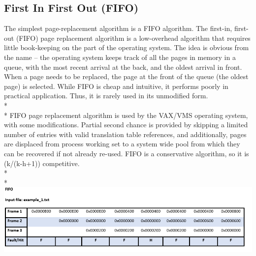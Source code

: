 \documentclass[12pt, oneside, a4paper]{report}
\begin{document}
\subsection*{First In First Out (FIFO)}
The simplest page-replacement algorithm is a FIFO algorithm. The first-in, first-out (FIFO) page replacement algorithm is a low-overhead algorithm that requires little book-keeping on the part of the operating system. The idea is obvious from the name – the operating system keeps track of all the pages in memory in a queue, with the most recent arrival at the back, and the oldest arrival in front. When a page needs to be replaced, the page at the front of the queue (the oldest page) is selected. While FIFO is cheap and intuitive, it performs poorly in practical application. Thus, it is rarely used in its unmodified form. 
\\*
\\*
FIFO page replacement algorithm is used by the VAX/VMS operating system, with some modifications. Partial second chance is provided by skipping a limited number of entries with valid translation table references, and additionally, pages are displaced from process working set to a system wide pool from which they can be recovered if not already re-used.
FIFO is a conservative algorithm, so it is (k/(k-h+1)) competitive. 
\\*
\\*
\includegraphics[scale=0.6]{fifo}
\newpage
\end{document}
